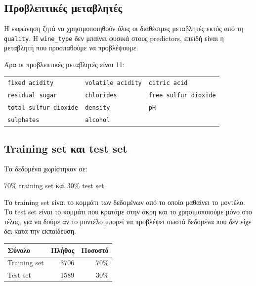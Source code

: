 \documentclass[12pt,a4paper]{article}
\newcommand{\code}[1]{\texttt{\textenglish{#1}}}
\begin{document}
\subsection{Προβλεπτικές μεταβλητές}

Η εκφώνηση ζητά να χρησιμοποιηθούν όλες οι διαθέσιμες μεταβλητές εκτός από τη
\code{quality}. Η \code{wine\_type} δεν μπαίνει φυσικά στους predictors,
επειδή είναι η μεταβλητή που προσπαθούμε να προβλέψουμε.

Άρα οι προβλεπτικές μεταβλητές είναι 11:

\begin{center}
\footnotesize
\begin{tabular}{lll}
\toprule
\code{fixed acidity} & \code{volatile acidity} & \code{citric acid} \\
\code{residual sugar} & \code{chlorides} & \code{free sulfur dioxide} \\
\code{total sulfur dioxide} & \code{density} & \code{pH} \\
\code{sulphates} & \code{alcohol} & \\
\bottomrule
\end{tabular}
\end{center}

\subsection{Training set και test set}

Τα δεδομένα χωρίστηκαν σε:

\begin{center}
70\% training set και 30\% test set.
\end{center}

Το training set είναι το κομμάτι των δεδομένων από το οποίο μαθαίνει το
μοντέλο. Το test set είναι το κομμάτι που κρατάμε στην άκρη και το
χρησιμοποιούμε μόνο στο τέλος, για να δούμε αν το μοντέλο μπορεί να προβλέψει
σωστά δεδομένα που δεν είχε δει κατά την εκπαίδευση.

\begin{center}
\begin{tabular}{lrr}
\toprule
\textbf{Σύνολο} & \textbf{Πλήθος} & \textbf{Ποσοστό} \\
\midrule
Training set & 3706 & 70\% \\
Test set & 1589 & 30\% \\
\bottomrule
\end{tabular}
\end{center}
\end{document}
